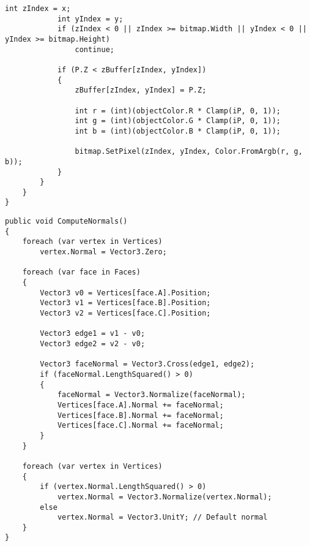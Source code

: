 \begin{center}
\begin{lstlisting}[label=lst:zbuf,caption=Алгоритм отрисовки полигона с помощью Z-буффера,numbers=none]
            int zIndex = x;
            int yIndex = y;
            if (zIndex < 0 || zIndex >= bitmap.Width || yIndex < 0 || yIndex >= bitmap.Height)
                continue;

            if (P.Z < zBuffer[zIndex, yIndex])
            {
                zBuffer[zIndex, yIndex] = P.Z;

                int r = (int)(objectColor.R * Clamp(iP, 0, 1));
                int g = (int)(objectColor.G * Clamp(iP, 0, 1));
                int b = (int)(objectColor.B * Clamp(iP, 0, 1));

                bitmap.SetPixel(zIndex, yIndex, Color.FromArgb(r, g, b));
            }
        }
    }
}
\end{lstlisting}
\end{center}

\begin{center}
\captionsetup{justification=raggedright,singlelinecheck=off}
\begin{lstlisting}[label=lst:тnormals,caption=Алгоритм обновления нормалей объекта,numbers=none]
public void ComputeNormals()
{
    foreach (var vertex in Vertices)
        vertex.Normal = Vector3.Zero;

    foreach (var face in Faces)
    {
        Vector3 v0 = Vertices[face.A].Position;
        Vector3 v1 = Vertices[face.B].Position;
        Vector3 v2 = Vertices[face.C].Position;

        Vector3 edge1 = v1 - v0;
        Vector3 edge2 = v2 - v0;

        Vector3 faceNormal = Vector3.Cross(edge1, edge2);
        if (faceNormal.LengthSquared() > 0)
        {
            faceNormal = Vector3.Normalize(faceNormal);
            Vertices[face.A].Normal += faceNormal;
            Vertices[face.B].Normal += faceNormal;
            Vertices[face.C].Normal += faceNormal;
        }
    }

    foreach (var vertex in Vertices)
    {
        if (vertex.Normal.LengthSquared() > 0)
            vertex.Normal = Vector3.Normalize(vertex.Normal);
        else
            vertex.Normal = Vector3.UnitY; // Default normal
    }
}
\end{lstlisting}
\end{center}

